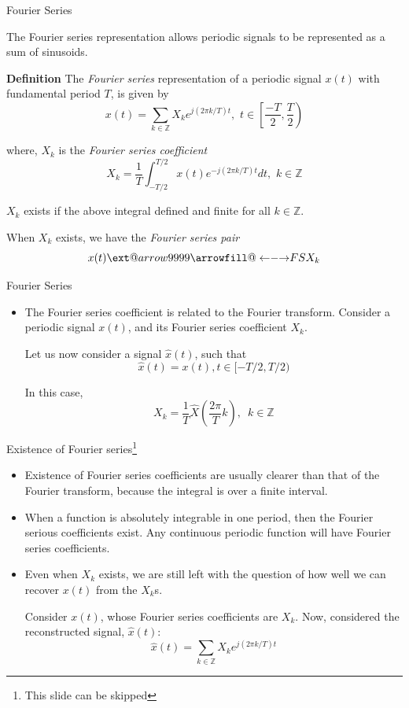 \documentclass{beamer}
\makeatletter
\newcommand\xleftrightarrow[2][]{%
  \ext@arrow 9999{\longleftrightarrowfill@}{#1}{#2}}
\newcommand\longleftrightarrowfill@{%
  \arrowfill@\leftarrow\relbar\rightarrow}
\makeatother
\begin{document}
\begin{frame}{Fourier Series}

The Fourier series representation allows periodic signals to be represented as a sum of sinusoids.
\vspace{2mm}

\textbf{Definition}
The \textit{Fourier series} representation of a periodic signal $x(t)$ with fundamental period $T$, is given by
\[ x(t) = \sum_{k\in\mathbb{Z}}X_ke^{j(2\pi k/T)t}, \,\, t \in \left[\left.\frac{-T}{2}, \frac{T}{2}\right.\right) \]

where, $X_k$ is the \textit{Fourier series coefficient}
\[ X_k = \frac{1}{T}\int_{-T/2}^{T/2}x(t) e^{-j(2\pi k/T)t}dt, \,\, k \in \mathbb{Z} \]

$X_k$ exists if the above integral defined and finite for all  $k \in \mathbb{Z}$.

When $X_k$ exists, we have the \textit{Fourier series pair}
\[ x(t) \xleftrightarrow{FS} X_k \]

\end{frame}

\begin{frame}{Fourier Series}

\begin{itemize}
\item The Fourier series coefficient is related to the Fourier transform. Consider a periodic signal $x(t)$, and its Fourier series coefficient $X_k$. 

Let us now consider a signal $\hat{x}(t)$, such that 
\[ \hat{x}(t) = x(t), t \in [-T/2, T/2) \]

In this case,
\[ X_k = \frac{1}{T}\hat{X}\left(\frac{2\pi}{T}k\right), \,\,\, k \in \mathbb{Z} \]
\end{itemize}

\end{frame}

\begin{frame}{Existence of Fourier series\footnote{This slide can be skipped}}

\begin{itemize}
\item Existence of Fourier series coefficients are usually clearer than that of the Fourier transform, because the integral is over a finite interval.

\item When a function is absolutely integrable in one period, then the Fourier serious coefficients exist. Any continuous periodic function will have Fourier series coefficients.

\item Even when $X_k$ exists, we are still left with the question of how well we can recover $x(t)$ from the $X_k$s.
\vspace{2mm}

Consider $x(t)$, whose Fourier series coefficients are $X_k$. Now, considered the reconstructed signal, $\hat{x}(t)$:
\[ \hat{x}(t) = \sum_{k\in \mathbb{Z}} X_ke^{j(2\pi k/T)t} \]
\end{itemize}

\end{frame}
\end{document}
